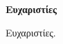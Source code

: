 \clearpage
\thispagestyle{plain}

\vspace*{\fill}
\begin{center}
  \vspace{-4cm} %
  \textbf{Ευχαριστίες}
  
  \vspace{1.5em} %
  \parbox{0.75\textwidth}
  {%
    Ευχαριστίες.
  }
\end{center}
\vspace*{\fill}